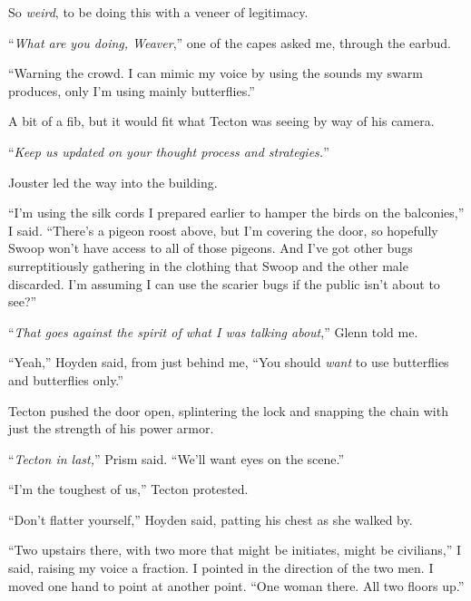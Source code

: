 So \emph{weird}, to be doing this with a veneer of legitimacy.



``\emph{What are you doing, Weaver},'' one of the capes asked me, through the earbud.



``Warning the crowd.  I can mimic my voice by using the sounds my swarm produces, only I'm using mainly butterflies.''



A bit of a fib, but it would fit what Tecton was seeing by way of his camera.



``\emph{Keep us updated on your thought process and strategies.}''



Jouster led the way into the building.



``I'm using the silk cords I prepared earlier to hamper the birds on the balconies,'' I said.  ``There's a pigeon roost above, but I'm covering the door, so hopefully Swoop won't have access to all of those pigeons.  And I've got other bugs surreptitiously gathering in the clothing that Swoop and the other male discarded.  I'm assuming I can use the scarier bugs if the public isn't about to see?''



``\emph{That goes against the spirit of what I was talking about},'' Glenn told me.



``Yeah,'' Hoyden said, from just behind me, ``You should \emph{want} to use butterflies and butterflies only.''



Tecton pushed the door open, splintering the lock and snapping the chain with just the strength of his power armor.



``\emph{Tecton in last,}'' Prism said.  ``We'll want eyes on the scene.''



``I'm the toughest of us,'' Tecton protested.



``Don't flatter yourself,'' Hoyden said, patting his chest as she walked by.



``Two upstairs there, with two more that might be initiates, might be civilians,'' I said, raising my voice a fraction.  I pointed in the direction of the two men.  I moved one hand to point at another point.  ``One woman there.  All two floors up.''



